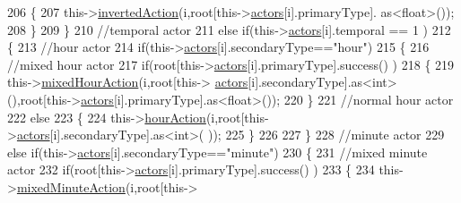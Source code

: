 \begin{DoxyCode}
206                     \{
207                         this->\hyperlink{class_jetpack_adacfc35fab4a621357caf98ce1c9cb54}{invertedAction}(i,root[this->\hyperlink{class_jetpack_a7e16d2f97837f9712a2e6de1c50d99db}{actors}[i].primaryType].
      as<float>());          
208                     \}
209                 \}
210                 \textcolor{comment}{//temporal actor}
211                 \textcolor{keywordflow}{else} \textcolor{keywordflow}{if}(this->\hyperlink{class_jetpack_a7e16d2f97837f9712a2e6de1c50d99db}{actors}[i].temporal == 1 )
212                 \{
213                     \textcolor{comment}{//hour actor}
214                     \textcolor{keywordflow}{if}(this->\hyperlink{class_jetpack_a7e16d2f97837f9712a2e6de1c50d99db}{actors}[i].secondaryType==\textcolor{stringliteral}{"hour"})
215                     \{
216                         \textcolor{comment}{//mixed hour actor}
217                         \textcolor{keywordflow}{if}(root[this->\hyperlink{class_jetpack_a7e16d2f97837f9712a2e6de1c50d99db}{actors}[i].primaryType].success() )
218                         \{
219                             this->\hyperlink{class_jetpack_ac1a49ab4867718cdb415ad74c2066b9d}{mixedHourAction}(i,root[this->
      \hyperlink{class_jetpack_a7e16d2f97837f9712a2e6de1c50d99db}{actors}[i].secondaryType].as<int>(),root[this->\hyperlink{class_jetpack_a7e16d2f97837f9712a2e6de1c50d99db}{actors}[i].primaryType].as<float>());
220                         \}
221                         \textcolor{comment}{//normal hour actor}
222                         \textcolor{keywordflow}{else}
223                         \{
224                             this->\hyperlink{class_jetpack_acd6889af2fe5b057c6bd51b6dac827ef}{hourAction}(i,root[this->\hyperlink{class_jetpack_a7e16d2f97837f9712a2e6de1c50d99db}{actors}[i].secondaryType].as<int>(
      ));
225                         \}
226                     
227                     \}
228                     \textcolor{comment}{//minute actor}
229                     \textcolor{keywordflow}{else} \textcolor{keywordflow}{if}(this->\hyperlink{class_jetpack_a7e16d2f97837f9712a2e6de1c50d99db}{actors}[i].secondaryType==\textcolor{stringliteral}{"minute"})
230                     \{
231                         \textcolor{comment}{//mixed minute actor}
232                         \textcolor{keywordflow}{if}(root[this->\hyperlink{class_jetpack_a7e16d2f97837f9712a2e6de1c50d99db}{actors}[i].primaryType].success() )
233                         \{
234                             this->\hyperlink{class_jetpack_acf8ed1fb594b9e8e224f4ed872a8e093}{mixedMinuteAction}(i,root[this->

\end{DoxyCode}
